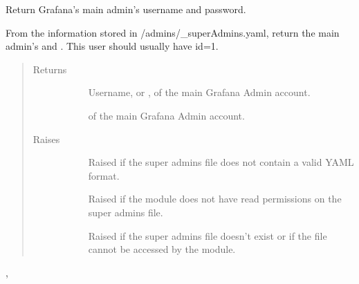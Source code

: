 \documentclass[letterpaper,10pt,english]{sphinxmanual}
\begin{document}
\begin{fulllineitems}
\label{\detokenize{yamlUtility:yamlUtility.getApiCredentials}}
Return Grafana’s main admin’s username and password.

From the information stored in /admins/\_superAdmins.yaml, return the main
admin’s  and . This user should usually have id=1.
\begin{quote}\begin{description}
\item[{Returns}] \leavevmode\begin{description}
\item[{}] \leavevmode{[}\sphinxtitleref{str}{]}
Username, or , of the main Grafana Admin account.

\item[{}] \leavevmode{[}\sphinxtitleref{str}{]}
 of the main Grafana Admin account.

\end{description}

\item[{Raises}] \leavevmode\begin{description}
\item[{}] \leavevmode
Raised if the super admins file does not contain a valid YAML format.

\item[{}] \leavevmode
Raised if the module does not have read permissions on the super admins
file.

\item[{}] \leavevmode
Raised if the super admins file doesn’t exist or if the file cannot be
accessed by the module.

\end{description}

\end{description}\end{quote}




{\hyperref[\detokenize{yamlUtility:yamlUtility.loadConfig}]{}}, {\hyperref[\detokenize{yamlUtility:yamlUtility.getYamlContent}]{}}



\end{fulllineitems}
\end{document}
